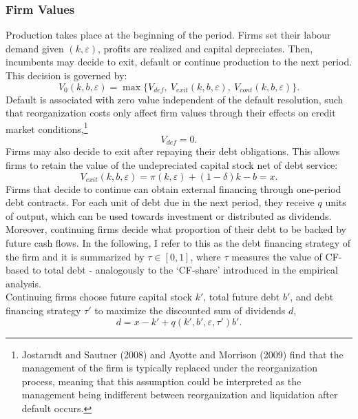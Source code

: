\documentclass[12pt]{article}
\begin{document}
\subsubsection{Firm Values} \label{sec:Firm Values}
Production takes place at the beginning of the period. Firms set their labour demand given $(k,\varepsilon)$, profits are realized and capital depreciates. Then, incumbents may decide to exit, default or continue production to the next period. This decision is governed by: 
\begin{equation} \label{eq:default decision}
    V_0(k,b,\varepsilon) = \max \{V_{def}, \  V_{exit}(k,b,\varepsilon),  \ V_{cont}(k,b,\varepsilon) \}.
\end{equation}
Default is associated with zero value independent of the default resolution, such that reorganization costs only affect firm values through their effects on credit market conditions,\footnote{Jostarndt and Sautner (2008) and Ayotte and Morrison (2009) find that the management of the firm is typically replaced under the reorganization process, meaning that this assumption could be interpreted as the management being indifferent between reorganization and liquidation after default occurs.} 
\begin{equation}
    V_{def} = 0.
\end{equation}
Firms may also decide to exit after repaying their debt obligations. This allows firms to retain the value of the undepreciated capital stock net of debt service: 
\begin{equation}
    V_{exit}(k, b, \varepsilon) = \pi(k,\varepsilon) + (1-\delta)k - b  = x.
\end{equation}
Firms that decide to continue can obtain external financing through one-period debt contracts. For each unit of debt due in the next period, they receive $q$ units of output, which can be used towards investment or distributed as dividends. Moreover, continuing firms decide what proportion of their debt to be backed by future cash flows. In the following, I refer to this as the debt financing strategy of the firm and it is summarized by $\tau \in [0,1]$, where $\tau$ measures the value of CF-based to total debt - analogously to the `CF-share' introduced in the empirical analysis. \vspace{3mm} \\
Continuing firms choose future capital stock $k'$, total future debt $b'$, and debt financing strategy $\tau'$ to maximize the discounted sum of dividends $d$, 
\begin{equation} \label{eq:dividends}
d = x - k' +  q(k',b',\varepsilon, \tau')b'.
\end{equation} 
\end{document}

